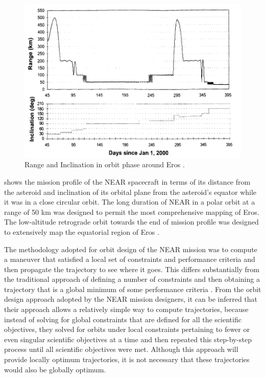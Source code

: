\begin{figure}[h]
\centering
\captionsetup{justification=centering}
\includegraphics[scale=0.35]{erosprofile.png}
\caption{Range and Inclination in orbit phase around Eros \cite{erosprofile}.}
\label{fig:erosprofile}
\end{figure}

 shows the mission profile of the \gls{NEAR} spacecraft in terms of its distance from the asteroid and inclination of its orbital plane from the asteroid's equator while it was in a close circular orbit. The long duration of \gls{NEAR} in a polar orbit at a range of 50 km was designed to permit the most comprehensive mapping of Eros. The low-altitude retrograde orbit towards the end of mission profile was designed to extensively map the equatorial region of Eros \cite{erosprofile}.

The methodology adopted for orbit design of the \gls{NEAR} mission was to compute a maneuver that satisfied a local set of constraints and performance criteria and then propagate the trajectory to see where it goes. This differs substantially from the traditional approach of defining a number of constraints and then obtaining a trajectory that is a global minimum of some performance criteria \cite{erosapproach}. From the orbit design approach adopted by the \gls{NEAR} mission designers, it can be inferred that their approach allows a relatively simple way to compute trajectories, because instead of solving for global constraints that are defined for all the scientific objectives, they solved for orbits under local constraints pertaining to fewer or even singular scientific objectives at a time and then repeated this step-by-step process until all scientific objectives were met. Although this approach will provide locally optimum trajectories, it is not necessary that these trajectories would also be globally optimum.

